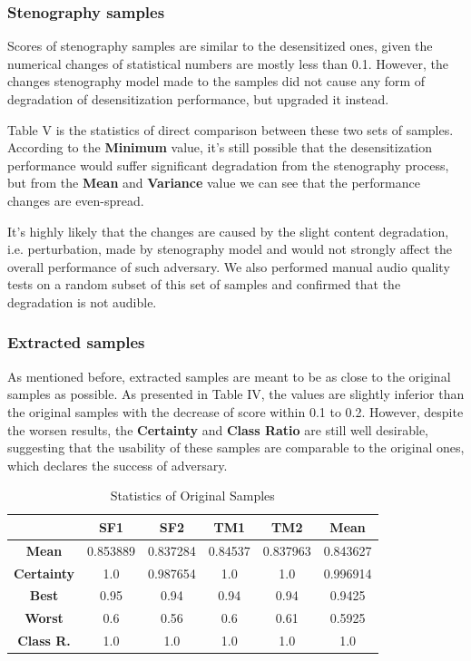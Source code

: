 \documentclass[journal]{IEEEtran} %
\begin{document}
\begin{CJK*}{UTF8}{gbsn}
\subsubsection{Stenography samples}

Scores of stenography samples are similar to the desensitized ones, given the numerical changes of statistical numbers are mostly less than 0.1. However, the changes stenography model made to the samples did not cause any form of degradation of desensitization performance, but upgraded it instead.

Table V is the statistics of direct comparison between these two sets of samples. According to the \textbf{Minimum} value, it's still possible that the desensitization performance would suffer significant degradation from the stenography process, but from the \textbf{Mean} and \textbf{Variance} value we can see that the performance changes are even-spread.

It's highly likely that the changes are caused by the slight content degradation, i.e. perturbation, made by stenography model and would not strongly affect the overall performance of such adversary. We also performed manual audio quality tests on a random subset of this set of samples and confirmed that the degradation is not audible.

\subsubsection{Extracted samples}

As mentioned before, extracted samples are meant to be as close to the original samples as possible. As presented in Table IV, the values are slightly inferior than the original samples with the decrease of score within 0.1 to 0.2. However, despite the worsen results, the \textbf{Certainty} and \textbf{Class Ratio} are still well desirable, suggesting that the usability of these samples are comparable to the original ones, which declares the success of adversary.

\begin{table}[htbp]
    \centering
    \caption{Statistics of Original Samples}
    \begin{tabular}{|c|c|c|c|c|c|}
        \hline
        & \textbf{SF1} & \textbf{SF2} & \textbf{TM1} & \textbf{TM2} & \textbf{Mean} \\
        \hline
        \textbf{Mean} & 0.853889 & 0.837284 & 0.84537 & 0.837963 & 0.843627 \\
        \hline
        \textbf{Certainty} & 1.0 & 0.987654 & 1.0 & 1.0 & 0.996914 \\
        \hline
        \textbf{Best} & 0.95 & 0.94 & 0.94 & 0.94 & 0.9425\\
        \hline
        \textbf{Worst} & 0.6 & 0.56 & 0.6 & 0.61 & 0.5925\\
        \hline
        \textbf{Class R.} & 1.0 & 1.0 & 1.0 & 1.0 & 1.0\\
        \hline
    \end{tabular}
    \label{tab:st_org}
\end{table}


\end{CJK*}
\end{document}
